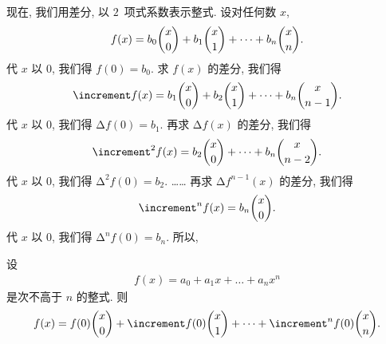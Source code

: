 \documentclass[../libro.tex]{subfiles}
\begin{document}
现在, 我们用差分, 以 \(2\)~项式系数表示整式.
设对任何数 \(x\),
\begin{align*}
    f(x) = b_0 \dbinom{x}{0} + b_1 \dbinom{x}{1} + \dots + b_n \dbinom{x}{n}.
\end{align*}
代 \(x\) 以 \(0\), 我们得 \(f(0) = b_0\).
求 \(f(x)\) 的差分, 我们得
\begin{align*}
    \increment f (x) = b_1 \dbinom{x}{0} + b_2 \dbinom{x}{1} + \dots + b_n \dbinom{x}{n-1}.
\end{align*}
代 \(x\) 以 \(0\), 我们得 \(\increment f (0) = b_1\).
再求 \(\increment f (x)\) 的差分, 我们得
\begin{align*}
    \increment^2 f (x) = b_2 \dbinom{x}{0} + \dots + b_n \dbinom{x}{n-2}.
\end{align*}
代 \(x\) 以 \(0\), 我们得 \(\increment^2 f (0) = b_2\).
……
再求 \(\increment f^{n-1} (x)\) 的差分, 我们得
\begin{align*}
    \increment^n f (x) = b_n \dbinom{x}{0}.
\end{align*}
代 \(x\) 以 \(0\), 我们得 \(\increment^n f (0) = b_n\).
所以,

\begin{theorem}
    设
    \begin{align*}
        f(x) = a_0 + a_1 x + \dots + a_n x^n
    \end{align*}
    是次不高于 \(n\) 的整式.
    则
    \begin{align*}
        f(x) =
        f (0) \dbinom{x}{0}
        + \increment f (0) \dbinom{x}{1}
        + \dots
        + \increment^n f (0) \dbinom{x}{n}.
    \end{align*}
\end{theorem}
\end{document}
